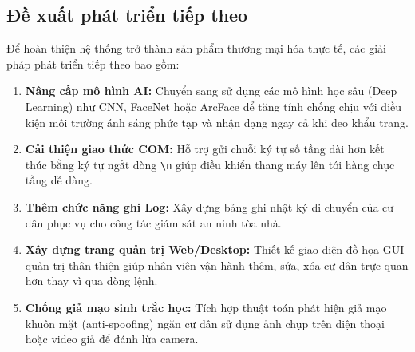 \documentclass[12pt,a4paper]{article}
\begin{document}
\subsection{Đề xuất phát triển tiếp theo}
Để hoàn thiện hệ thống trở thành sản phẩm thương mại hóa thực tế, các giải pháp phát triển tiếp theo bao gồm:
\begin{enumerate}
    \item \textbf{Nâng cấp mô hình AI:} Chuyển sang sử dụng các mô hình học sâu (Deep Learning) như CNN, FaceNet hoặc ArcFace để tăng tính chống chịu với điều kiện môi trường ánh sáng phức tạp và nhận dạng ngay cả khi đeo khẩu trang.
    \item \textbf{Cải thiện giao thức COM:} Hỗ trợ gửi chuỗi ký tự số tầng dài hơn kết thúc bằng ký tự ngắt dòng \texttt{\textbackslash n} giúp điều khiển thang máy lên tới hàng chục tầng dễ dàng.
    \item \textbf{Thêm chức năng ghi Log:} Xây dựng bảng ghi nhật ký di chuyển của cư dân phục vụ cho công tác giám sát an ninh tòa nhà.
    \item \textbf{Xây dựng trang quản trị Web/Desktop:} Thiết kế giao diện đồ họa GUI quản trị thân thiện giúp nhân viên vận hành thêm, sửa, xóa cư dân trực quan hơn thay vì qua dòng lệnh.
    \item \textbf{Chống giả mạo sinh trắc học:} Tích hợp thuật toán phát hiện giả mạo khuôn mặt (anti-spoofing) ngăn cư dân sử dụng ảnh chụp trên điện thoại hoặc video giả để đánh lừa camera.
\end{enumerate}
\end{document}
